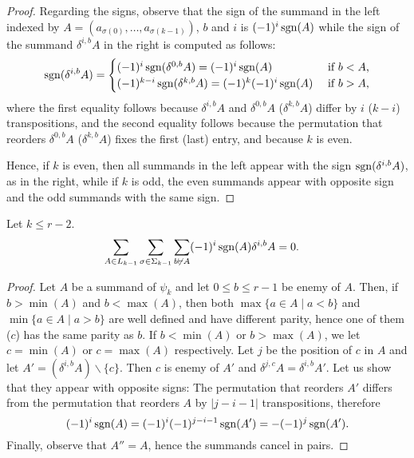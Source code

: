 \begin{proof}
	Regarding the signs, observe that the sign of the summand in the left indexed by $A = (a_{\sigma(0)},\ldots,a_{\sigma(k-1)})$, $b$ and $i$ is $(-1)^i\operatorname*{sgn}(A)$ while the sign of the summand $\delta^{i,b}A$ in the right is computed as follows:
	\[
		\operatorname*{sgn}(\delta^{i,b}A) =
		\begin{cases}
			(-1)^i\operatorname*{sgn}(\delta^{0,b}A) = (-1)^i\operatorname*{sgn}(A) &\text{ if $b<A$,}\\
			(-1)^{k-i}\operatorname*{sgn}(\delta^{k,b}A) = (-1)^k(-1)^i\operatorname*{sgn}(A) &\text{ if $b>A$,}
		\end{cases}
	\]
	where the first equality follows because $\delta^{i,b}A$ and $\delta^{0,b}A$ (\resp $\delta^{k,b}A$) differ by $i$ (\resp $k-i$) transpositions, and the second equality follows because the permutation that reorders $\delta^{0,b}A$ (\resp $\delta^{k,b}A$) fixes the first (last) entry, and because $k$ is even.

	Hence, if $k$ is even, then all summands in the left appear with the sign $\operatorname*{sgn}(\delta^{i,b}A)$, as in the right, while if $k$ is odd, the even summands appear with opposite sign and the odd summands with the same sign.
\end{proof}

\begin{lemma}\label{lemma:cancel}
	Let $k\leq r-2$.
	\begin{align*}
		\sum_{A\in L_{k-1}}\sum_{\sigma\in \Sigma_{k-1}}\sum_{b\not{\vdash} A}(-1)^i\operatorname*{sgn}(A)\delta^{i,b}A &= 0.
	\end{align*}
\end{lemma}

\begin{proof}
	Let $A$ be a summand of $\psi_k$ and let $0\leq b\leq r-1$ be enemy of $A$. Then, if $b >\min(A)$ and $b<\max(A)$, then both $\max\{a\in A\mid a<b\}$ and $\min\{a\in A\mid a>b\}$ are well defined and have different parity, hence one of them ($c$) has the same parity as $b$. If $b<\min(A)$ or $b>\max(A)$, we let $c = \min(A)$ or $c = \max(A)$ respectively. Let $j$ be the position of $c$ in $A$ and let $A' = (\delta^{i,b} A)\smallsetminus \{c\}$. Then $c$ is enemy of $A'$ and $\delta^{j,c}A = \delta^{i,b}A'$. Let us show that they appear with opposite signs: The permutation that reorders $A'$ differs from the permutation that reorders $A$ by $|j-i-1|$ transpositions, therefore
	\[(-1)^{i}\operatorname*{sgn}(A) = (-1)^{i}(-1)^{j-i-1}\operatorname*{sgn}(A') = -(-1)^j\operatorname*{sgn}(A').\]
	Finally, observe that $A'' = A$, hence the summands cancel in pairs.
\end{proof}